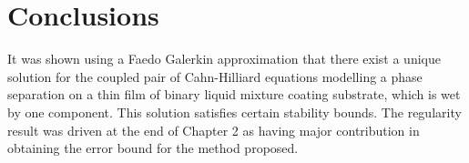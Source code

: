 \setcounter{equation}{0}
\chapter{Conclusions}
It was shown using a Faedo Galerkin approximation that there exist a unique solution for  the coupled pair of Cahn-Hilliard equations
modelling  a phase separation on a thin
film of binary liquid mixture coating substrate, which is wet by one
component.  This solution satisfies certain stability
bounds. The regularity result was driven at the end of Chapter 2 as having
major contribution in obtaining the error bound for the method proposed.  


